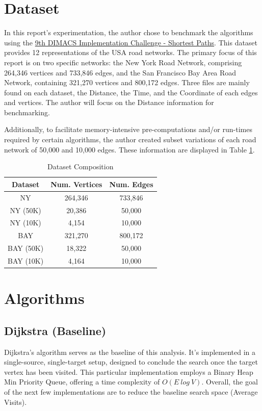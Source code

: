 \documentclass{article}
\begin{document}
\section{Dataset}

In this report's experimentation, the author chose to benchmark the algorithms using the \href{http://www.diag.uniroma1.it/~challenge9/download.shtml}{9th DIMACS Implementation Challenge - Shortest Paths}. This dataset provides 12 representations of the USA road networks. The primary focus of this report is on two specific networks: the New York Road Network, comprising 264,346 vertices and 733,846 edges, and the San Francisco Bay Area Road Network, containing 321,270 vertices and 800,172 edges. Three files are mainly found on each dataset, the Distance, the Time, and the Coordinate of each edges and vertices. The author will focus on the Distance information for benchmarking.

Additionally, to facilitate memory-intensive pre-computations and/or run-times required by certain algorithms, the author created subset variations of each road network of 50,000 and 10,000 edges. These information are displayed in Table \ref{tab:datacomp}.


\begin{table}
    \centering
    \begin{tabular}{ccc}
        Dataset & Num. Vertices & Num. Edges \\
        \hline
        NY & 264,346 & 733,846 \\
        NY (50K) & 20,386 & 50,000 \\
        NY (10K) & 4,154 & 10,000 \\
        \hline
        BAY & 321,270 & 800,172 \\
        BAY (50K) & 18,322 & 50,000 \\
        BAY (10K) & 4,164 & 10,000 \\
        \hline
    \end{tabular}
    \caption{Dataset Composition}
    \label{tab:datacomp}
\end{table}

\section{Algorithms}
\subsection{Dijkstra (Baseline)}

Dijkstra's algorithm serves as the baseline of this analysis. It's 
implemented in a single-source, single-target setup, designed to conclude 
the search once the target vertex has been visited. This particular 
implementation employs a Binary Heap Min Priority Queue, offering a time 
complexity of \(O(E \ log \ V)\). Overall, the goal of the next few 
implementations are to reduce the baseline search space (Average Visits).
\end{document}
